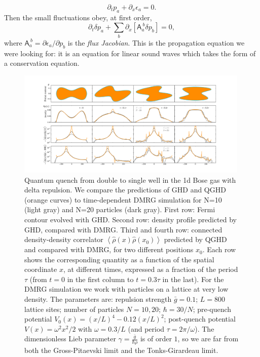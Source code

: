 \documentclass[twocolumn,amsfonts,showpacs,superscriptaddress]{revtex4-1}
\begin{document}
\begin{equation}\label{eq:ka}
	\partial_t p_a + \partial_x \epsilon_a = 0.
\end{equation}
Then the small fluctuations obey, at first order,
\begin{equation}\label{eq:deltaka}
	\partial_t \delta p_a + \sum_b\partial_x[\mathsf A_a^{~b} \delta p_b] = 0,
\end{equation}
where $ \mathsf A_a^{~b} = \partial \epsilon_a/\partial p_b$ is the {\it flux Jacobian}. This is the propagation equation we were looking for: it is an equation for linear sound waves which takes the form of a conservation equation.


\begin{figure}[t]
\centering
\includegraphics[width = 0.99\textwidth]{fig2.pdf}
\caption{Quantum quench from double to single well in the 1d Bose gas with delta repulsion. We compare the predictions of GHD and QGHD (orange curves) to time-dependent DMRG simulation for N=10 (light gray) and N=20 particles (dark gray). First row: Fermi contour evolved with GHD. Second row: density profile predicted by GHD, compared with DMRG. Third and fourth row: connected density-density correlator $\left< \hat{\rho} (x) \hat{\rho} (x_0)\right>$ predicted by QGHD and compared with DMRG, for two different positions $x_0$. Each row shows the corresponding quantity as a function of the spatial coordinate $x$, at different times, expressed as a fraction of the period $\tau$ (from $t=0$ in the first column to $t=0.3 \tau$ in the last). 
For the DMRG simulation we work with particles on a lattice at very low density. The parameters are: repulsion strength $\bar{g} = 0.1$; $L=800$ lattice sites; number of particles $N=10, 20$; $\hbar = 30/N$; pre-quench potential $V_0(x)= (x/L)^4 - 0.12 (x/L)^2$; post-quench potential $V(x) = \omega^2 x^2 /2$ with $\omega=0.3/L$ (and period $\tau= 2\pi/\omega$). The dimensionless Lieb parameter $\gamma = \frac{\bar{g}}{\hbar \rho}$ is of order $1$, so we are far from both the Gross-Pitaevski limit and the Tonks-Girardeau limit.}
\label{movie}
\end{figure}
\end{document}
